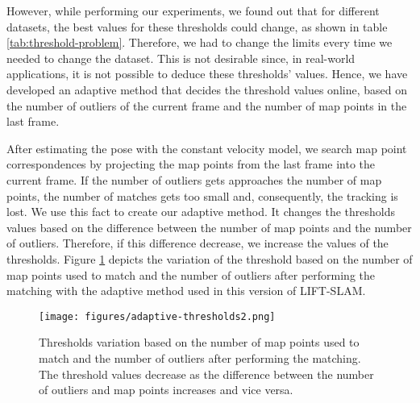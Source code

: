 However, while performing our experiments, we found out that for different datasets, the best values for these thresholds could change, as shown in table \ref{tab:threshold-problem}. Therefore, we had to change the limits every time we needed to change the dataset. This is not desirable since, in real-world applications, it is not possible to deduce these thresholds' values. Hence, we have developed an adaptive method that decides the threshold values online, based on the number of outliers of the current frame and the number of map points in the last frame.

\begin{table}[!htb]
\centering
{}
\caption{Absolute Trajectory Error (ATE) \cite{tum-vi} for different matching thresholds in KITTI and Euroc datasets. In Euroc MH\_01 sequence, the error is completely different for different thresholds, where the best thresholds are $TH_{LOW} = 1.0$ and $TH_{HIGH}=1.5$. Furthermore, in KITTI 05 sequence, the algorithm could track the camera pose only with $TH_{LOW} = 2.0$ and $TH_{HIGH}=3.0$.}
\label{tab:threshold-problem}
\end{table}

After estimating the pose with the constant velocity model, we search map point correspondences by projecting the map points from the last frame into the current frame. If the number of outliers gets approaches the number of map points, the number of matches gets too small and, consequently, the tracking is lost. We use this fact to create our adaptive method. It changes the thresholds values based on the difference between the number of map points and the number of outliers. Therefore, if this difference decrease, we increase the values of the thresholds. Figure \ref{fig:adaptive-thresholds} depicts the variation of the threshold based on the number of map points used to match and the number of outliers after performing the matching with the adaptive method used in this version of LIFT-SLAM. 

\begin{figure}
\centerline{\texttt{[image: figures/adaptive-thresholds2.png]}}
\caption[Thresholds in Adaptive LIFT-SLAM.]{Thresholds variation based on the number of map points used to match and the number of outliers after performing the matching. The threshold values decrease as the difference between the number of outliers and map points increases and vice versa.}
\label{fig:adaptive-thresholds}
\end{figure}
